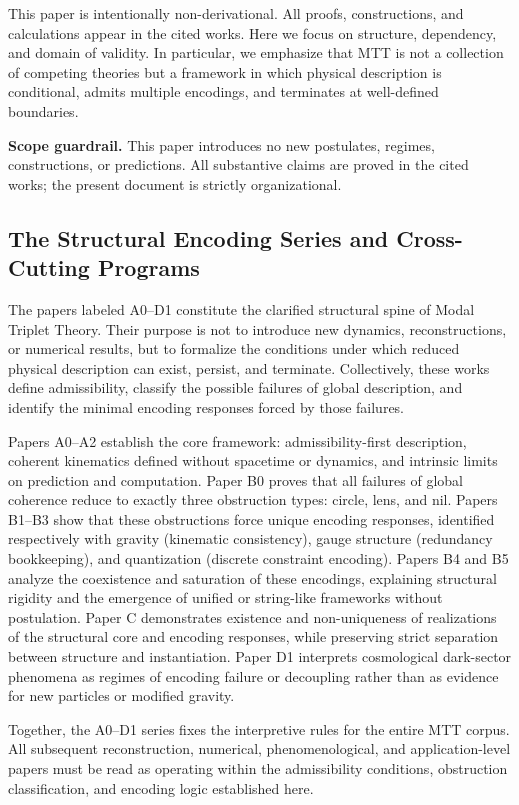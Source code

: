 \documentclass[11pt]{article}
\begin{document}
This paper is intentionally non-derivational. All proofs, constructions, and calculations appear in the cited works. Here we focus on structure, dependency, and domain of validity. In particular, we emphasize that MTT is not a collection of competing theories but a framework in which physical description is conditional, admits multiple encodings, and terminates at well-defined boundaries.

\noindent\textbf{Scope guardrail.}
This paper introduces no new postulates, regimes, constructions, or predictions.
All substantive claims are proved in the cited works; the present document is strictly organizational.

\subsection{The Structural Encoding Series and Cross-Cutting Programs}

The papers labeled A0--D1 constitute the clarified structural spine of Modal Triplet Theory.
Their purpose is not to introduce new dynamics, reconstructions, or numerical results, but to
formalize the conditions under which reduced physical description can exist, persist, and
terminate. Collectively, these works define admissibility, classify the possible failures of global
description, and identify the minimal encoding responses forced by those failures.

Papers A0--A2 establish the core framework: admissibility-first description, coherent kinematics
defined without spacetime or dynamics, and intrinsic limits on prediction and computation.
Paper B0 proves that all failures of global coherence reduce to exactly three obstruction types:
circle, lens, and nil. Papers B1--B3 show that these obstructions force unique encoding responses,
identified respectively with gravity (kinematic consistency), gauge structure (redundancy
bookkeeping), and quantization (discrete constraint encoding). Papers B4 and B5 analyze the
coexistence and saturation of these encodings, explaining structural rigidity and the emergence
of unified or string-like frameworks without postulation. Paper C demonstrates existence and
non-uniqueness of realizations of the structural core and encoding responses, while preserving
strict separation between structure and instantiation. Paper D1 interprets cosmological dark-sector
phenomena as regimes of encoding failure or decoupling rather than as evidence for new particles
or modified gravity.

Together, the A0--D1 series fixes the interpretive rules for the entire MTT corpus. All subsequent
reconstruction, numerical, phenomenological, and application-level papers must be read as
operating within the admissibility conditions, obstruction classification, and encoding logic
established here.
\end{document}
